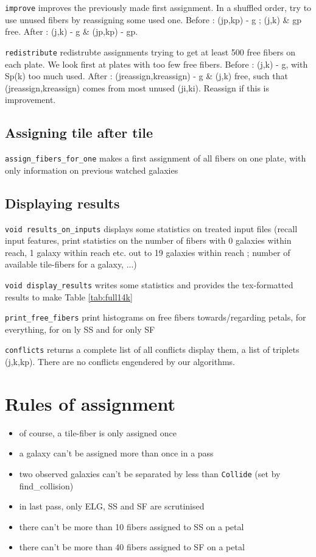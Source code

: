 \documentclass{article}
\begin{document}
{\tt improve} improves the previously made first assignment. In a shuffled order, try to use unused fibers by reassigning some used one. Before : (jp,kp) - g ; (j,k) \& gp free. After : (j,k) - g \& (jp,kp) - gp.

{\tt redistribute} redistrubte assignments trying to get at least 500 free fibers on each plate. We look first at plates with too few free fibers. Before : (j,k) - g, with Sp(k) too much used. After : (jreassign,kreassign) - g \& (j,k) free, such that (jreassign,kreassign) comes from most unused (ji,ki). Reassign if this is improvement.

\subsection{Assigning tile after tile}
{\tt assign\_fibers\_for\_one} makes a first assignment of all fibers on one plate, with only information on previous watched galaxies

\subsection{Displaying results}
{\tt void results\_on\_inputs} displays some statistics on treated input files (recall input features, print statistics on the number of fibers with 0 galaxies within reach, 1 galaxy within reach etc. out to 19 galaxies within reach ; number of available tile-fibers for a galaxy, ...)

{\tt void display\_results} writes some statistics and provides the tex-formatted results to make Table \ref{tab:full14k}

 {\tt print\_free\_fibers} print histograms on free fibers towards/regarding petals, for everything, for on ly SS and for only SF

 {\tt conflicts} returns a complete list of all conflicts display them, a list of triplets (j,k,kp). There are no conflicts engendered by our algorithms.
 
\section{Rules of assignment}
       \begin{itemize}
\item of course, a tile-fiber is only assigned once
\item a galaxy can't be assigned more than once in a pass
\item two observed galaxies can't be separated by less than {\tt Collide} (set by find\_collision)
\item in last pass, only ELG, SS and SF are scrutinised
\item there can't be more than 10 fibers assigned to SS on a petal
\item there can't be more than 40 fibers assigned to SF on a petal
       \end{itemize}
\end{document}
